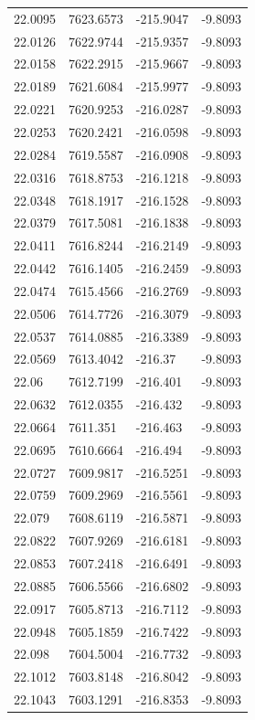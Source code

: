 \begin{table}[H]
\begin{tabular}{llll}
22.0095 & 7623.6573 & -215.9047 & -9.8093 \\
22.0126 & 7622.9744 & -215.9357 & -9.8093 \\
22.0158 & 7622.2915 & -215.9667 & -9.8093 \\
22.0189 & 7621.6084 & -215.9977 & -9.8093 \\
22.0221 & 7620.9253 & -216.0287 & -9.8093 \\
22.0253 & 7620.2421 & -216.0598 & -9.8093 \\
22.0284 & 7619.5587 & -216.0908 & -9.8093 \\
22.0316 & 7618.8753 & -216.1218 & -9.8093 \\
22.0348 & 7618.1917 & -216.1528 & -9.8093 \\
22.0379 & 7617.5081 & -216.1838 & -9.8093 \\
22.0411 & 7616.8244 & -216.2149 & -9.8093 \\
22.0442 & 7616.1405 & -216.2459 & -9.8093 \\
22.0474 & 7615.4566 & -216.2769 & -9.8093 \\
22.0506 & 7614.7726 & -216.3079 & -9.8093 \\
22.0537 & 7614.0885 & -216.3389 & -9.8093 \\
22.0569 & 7613.4042 & -216.37 & -9.8093 \\
22.06 & 7612.7199 & -216.401 & -9.8093 \\
22.0632 & 7612.0355 & -216.432 & -9.8093 \\
22.0664 & 7611.351 & -216.463 & -9.8093 \\
22.0695 & 7610.6664 & -216.494 & -9.8093 \\
22.0727 & 7609.9817 & -216.5251 & -9.8093 \\
22.0759 & 7609.2969 & -216.5561 & -9.8093 \\
22.079 & 7608.6119 & -216.5871 & -9.8093 \\
22.0822 & 7607.9269 & -216.6181 & -9.8093 \\
22.0853 & 7607.2418 & -216.6491 & -9.8093 \\
22.0885 & 7606.5566 & -216.6802 & -9.8093 \\
22.0917 & 7605.8713 & -216.7112 & -9.8093 \\
22.0948 & 7605.1859 & -216.7422 & -9.8093 \\
22.098 & 7604.5004 & -216.7732 & -9.8093 \\
22.1012 & 7603.8148 & -216.8042 & -9.8093 \\
22.1043 & 7603.1291 & -216.8353 & -9.8093 \\

\end{tabular}
\end{table}

